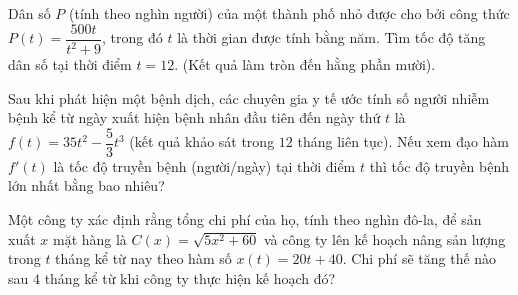 \begin{bt}%
	Dân số $P$ (tính theo nghìn người) của một thành phố nhỏ được cho bởi công thức $P(t)=\dfrac{500t}{t^2+9}$, trong đó $t$ là thời gian được tính bằng năm. Tìm tốc độ tăng dân số tại thời điểm $t=12$. (Kết quả làm tròn đến hằng phần mười).
	
\end{bt}

\begin{bt}%
	Sau khi phát hiện một bệnh dịch, các chuyên gia y tế ước tính số người nhiễm bệnh kể từ ngày xuất hiện bệnh nhân đầu tiên đến ngày thứ $t$ là $f(t)=35 t^2-\dfrac{5}{3} t^3$ (kết quả khảo sát trong $12$ tháng liên tục). Nếu xem đạo hàm $f'(t)$ là tốc độ truyền bệnh (người/ngày) tại thời điểm $t$ thì tốc độ truyền bệnh lớn nhất bằng bao nhiêu?
\end{bt}

\begin{bt}%

	Một công ty xác định rằng tổng chi phí của họ, tính theo nghìn đô-la, để sản xuất $x$ mặt hàng là $C(x)=\sqrt{5x^2+60}$ và công ty lên kế hoạch nâng sản lượng trong $t$ tháng kể từ nay theo hàm số $x(t)=20t+40$. Chi phí sẽ tăng thế nào sau $4$ tháng kể từ khi công ty thực hiện kế hoạch đó?
\end{bt}


